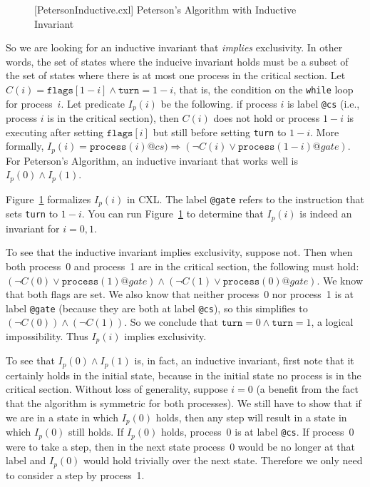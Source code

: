 \documentclass{report}
\newenvironment{code}{
\tcolorbox
}{
\endtcolorbox
}
\begin{document}
\begin{figure}
\begin{code}
\end{code}
\caption{[PetersonInductive.cxl] Peterson's Algorithm with Inductive Invariant}
\label{fig:petersonproof}
\end{figure}

So we are looking for an inductive invariant that \emph{implies} exclusivity.
In other words, the set of states where the inducive invariant holds
must be a subset of the set of states where there is at most one process in
the critical section.
Let $C(i) = \mathtt{flags}[1 - i] \land
\mathtt{turn} = 1 - i$, that is, the condition on the \texttt{while} loop
for process~$i$.
Let predicate $I_p(i)$ be the following.
if process $i$ is label \texttt{@cs} (i.e., process $i$ is in the critical section),
then $C(i)$ does not hold or process $1-i$ is executing after setting
$\mathtt{flags}[i]$ but still before setting \texttt{turn} to $1-i$.
More formally, $I_p(i) = \mathtt{process}(i)@cs) \Rightarrow (\lnot C(i) \lor \mathtt{process}(1-i)@gate)$.
For Peterson's Algorithm, an inductive invariant that works well is
$I_p(0) \land I_p(1)$.

Figure~\ref{fig:petersonproof} formalizes $I_p(i)$ in CXL.
The label \texttt{@gate} refers to the instruction that sets \texttt{turn} to $1-i$.
You can run Figure~\ref{fig:petersonproof} to determine
that $I_p(i)$ is indeed an invariant for $i = 0, 1$.

To see that the inductive invariant implies exclusivity, suppose not.  Then
when both process~0 and process~1 are in the critical section, the
following must hold:
$(\lnot C(0) \lor \mathtt{process}(1)@gate) \land
 (\lnot C(1) \lor \mathtt{process}(0)@gate)$.
We know that both flags are set.
We also know that neither process~0 nor process~1 is at label \texttt{@gate}
(because they are both at label \texttt{@cs}),
so this simplifies to $(\lnot C(0)) \land (\lnot C(1))$.
So we conclude that $\mathtt{turn} = 0 \land \mathtt{turn} = 1$, a
logical impossibility.  Thus $I_p(i)$ implies exclusivity.

To see that $I_p(0) \land I_p(1)$ is, in fact, an inductive invariant, first note that
it certainly holds in the initial state, because in the initial state no process
is in the critical section.
Without loss of generality, suppose $i=0$ (a benefit from the fact that the algorithm is
symmetric for both processes).  We still have to show that if we are in a state
in which $I_p(0)$ holds, then any step will result in a state in which
$I_p(0)$ still holds.
If $I_p(0)$ holds, process~0 is at label \texttt{@cs}.  If process~0
were to take a step, then in the next state process~0 would be no longer
at that label and $I_p(0)$ would hold trivially over the next state.
Therefore we only need to consider a step by process~1.
\end{document}
